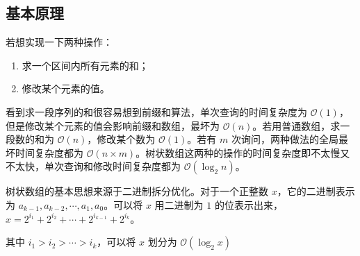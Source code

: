 
\subsection{基本原理}

若想实现一下两种操作：
\begin{enumerate}
\item 求一个区间内所有元素的和；
\item 修改某个元素的值。
\end{enumerate}

看到求一段序列的和很容易想到前缀和算法，单次查询的时间复杂度为 $\mathcal{O}(1)$，但是修改某个元素的值会影响前缀和数组，最坏为 $\mathcal{O}(n)$。若用普通数组，求一段数的和为 $\mathcal{O}(n)$，修改某个数为 $\mathcal{O}(1)$。若有 $m$ 次询问，两种做法的全局最坏时间复杂度都为 $\mathcal{O}(n \times m)$。树状数组这两种的操作的时间复杂度即不太慢又不太快，单次查询和修改时间复杂度都为 $\mathcal{O}(\log_2 n)$。

树状数组的基本思想来源于二进制拆分优化。对于一个正整数 $x$，它的二进制表示为 $a_{k - 1}, a_{k - 2}, \cdots , a_1, a_0$。可以将 $x$ 用二进制为 $1$ 的位表示出来，$x = 2^{i_1} + 2^{i_2} + \cdots + 2^{i_{k - 1}} + 2^{i_k}$。

其中 $i_1 > i_2 > \cdots > i_k$，可以将 $x$ 划分为 $\mathcal{O}(\log_2 x)$